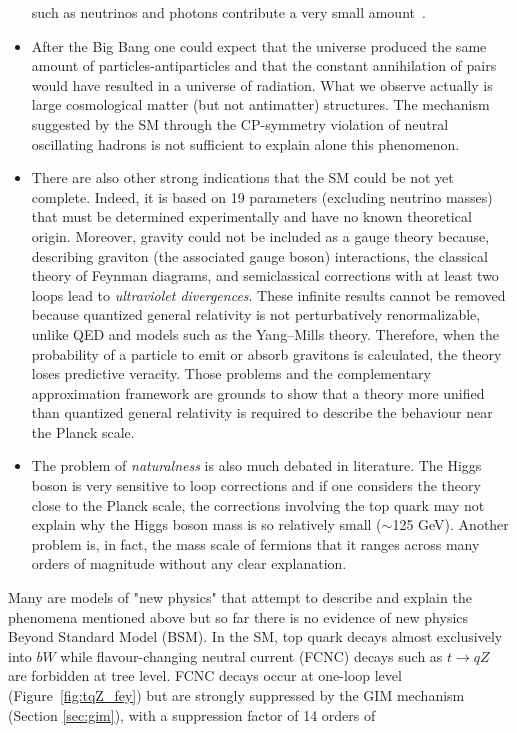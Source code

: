 \begin{itemize}
such as neutrinos and photons contribute a very small amount~\cite{plank}. 
\item After the Big Bang one could expect that the universe produced the same amount of particles-antiparticles and that the constant annihilation
of pairs would have resulted in a universe of radiation. What we observe actually is large cosmological matter (but not antimatter) structures.
The mechanism suggested by the SM through the CP-symmetry violation of neutral oscillating hadrons is not sufficient to explain alone this phenomenon.
\item There are also other strong indications that the SM could be not yet complete. Indeed, it is based on 19 parameters (excluding neutrino masses)
that must be determined experimentally and have no known theoretical origin.  Moreover, gravity could not be included as a gauge theory because, 
describing graviton (the associated gauge boson) interactions, the classical theory of  Feynman diagrams, and semiclassical corrections with 
at least two loops lead to \textit{ultraviolet divergences}. These infinite results cannot be removed 
because quantized general relativity is not perturbatively renormalizable, unlike QED and models such as the Yang–Mills theory. 
Therefore, when the probability of a particle to emit or absorb gravitons is calculated, the theory loses predictive veracity. 
Those problems and the complementary approximation framework are grounds to show that a theory more unified than quantized general relativity is 
required to describe the behaviour near the Planck scale. 
\item The problem of \textit{naturalness} is also much debated in literature. The Higgs boson is very sensitive to loop corrections and if one considers the theory close to the Planck scale, the corrections involving the top quark may not explain why the Higgs boson mass is so relatively small ($\sim$125 GeV). Another problem is, in fact, the mass scale of fermions that it ranges across many orders of magnitude without any clear explanation.
\end{itemize}
Many are models of "new physics" that attempt to describe and explain the phenomena mentioned above but so far there is no evidence of new physics Beyond Standard Model (BSM). 
In the SM, top quark decays almost exclusively into $bW$ while flavour-changing neutral current (FCNC) decays such as $t\rightarrow qZ$ are forbidden at tree level. 
FCNC decays occur at one-loop level (Figure~\ref{fig:tqZ_fey}) but are strongly suppressed by the GIM mechanism (Section \ref{sec:gim}), with a suppression factor of 14 orders of
